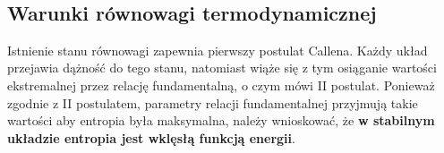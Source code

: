 \documentclass[12pt,a4paper,openright]{report} %
\begin{document}
\\
\subsection{Warunki równowagi termodynamicznej} 
Istnienie stanu równowagi zapewnia pierwszy postulat Callena. Każdy układ przejawia dążność do tego stanu, natomiast wiąże się z tym osiąganie wartości ekstremalnej przez relację fundamentalną, o czym mówi II postulat. Ponieważ zgodnie z II postulatem, parametry relacji fundamentalnej przyjmują takie wartości aby entropia była maksymalna, należy wnioskować, że \textbf{w stabilnym układzie entropia jest wklęsłą funkcją energii}.  
\end{document}
